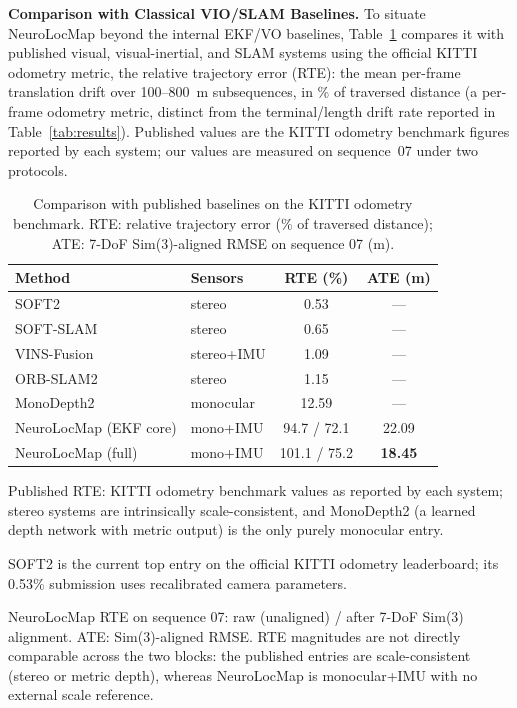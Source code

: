 \textbf{Comparison with Classical VIO/SLAM Baselines.} To situate NeuroLocMap beyond the internal EKF/VO baselines, Table~\ref{tab:external} compares it with published visual, visual-inertial, and SLAM systems using the official KITTI odometry metric, the relative trajectory error (RTE): the mean per-frame translation drift over 100--800~m subsequences, in \% of traversed distance (a per-frame odometry metric, distinct from the terminal/length drift rate reported in Table~\ref{tab:results}). Published values are the KITTI odometry benchmark figures reported by each system; our values are measured on sequence~07 under two protocols.

\begin{table}[!t]
    \centering
    \setlength{\tabcolsep}{4pt}
    \footnotesize
    \caption{Comparison with published baselines on the KITTI odometry benchmark. RTE: relative trajectory error (\% of traversed distance); ATE: 7-DoF Sim(3)-aligned RMSE on sequence 07 (m).}
    \label{tab:external}
    \begin{threeparttable}
        \begin{tabular}{@{}l l c c@{}}
            \toprule
            Method & Sensors & RTE (\%) & ATE (m) \\
            \midrule
            SOFT2~\cite{cvisic2023soft2}      & stereo     & 0.53  & --- \\
            SOFT-SLAM~\cite{Cvisic2017}       & stereo     & 0.65  & --- \\
            VINS-Fusion~\cite{VinsFusion2018} & stereo+IMU & 1.09  & --- \\
            ORB-SLAM2~\cite{MurArtal2017}     & stereo     & 1.15  & --- \\
            MonoDepth2~\cite{Godard2021}      & monocular  & 12.59 & --- \\
            \midrule
            NeuroLocMap (EKF core)  & mono+IMU & 94.7 / 72.1  & 22.09 \\
            NeuroLocMap (full)      & mono+IMU & 101.1 / 75.2 & \textbf{18.45} \\
            \bottomrule
        \end{tabular}
        \begin{tablenotes}
            \scriptsize
            \item Published RTE: KITTI odometry benchmark values as reported by each system; stereo systems are intrinsically scale-consistent, and MonoDepth2 (a learned depth network with metric output) is the only purely monocular entry.
            \item SOFT2 is the current top entry on the official KITTI odometry leaderboard; its 0.53\% submission uses recalibrated camera parameters.
            \item NeuroLocMap RTE on sequence 07: raw (unaligned) / after 7-DoF Sim(3) alignment. ATE: Sim(3)-aligned RMSE. RTE magnitudes are not directly comparable across the two blocks: the published entries are scale-consistent (stereo or metric depth), whereas NeuroLocMap is monocular+IMU with no external scale reference.
        \end{tablenotes}
    \end{threeparttable}
\end{table}

